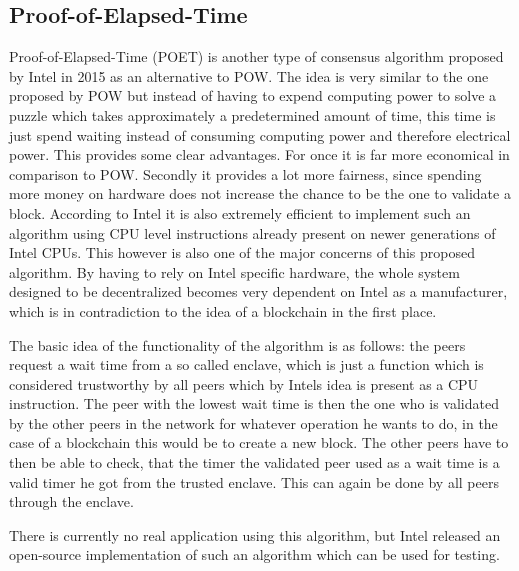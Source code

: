 \subsection{Proof-of-Elapsed-Time}

Proof-of-Elapsed-Time (POET) is another type of consensus algorithm proposed by Intel in 2015 as an alternative to POW. The idea is very similar to the one proposed by POW but instead of having
to expend computing power to solve a puzzle which takes approximately a predetermined amount of time, this time is just spend waiting instead of consuming computing power and therefore
electrical power. This provides some clear advantages. For once it is far more economical in comparison to POW. Secondly it provides a lot more fairness, since spending more money on hardware
does not increase the chance to be the one to validate a block. According to Intel it is also extremely efficient to implement such an algorithm using CPU level instructions already present on
newer generations of Intel CPUs. This however is also one of the major concerns of this proposed algorithm. By having to rely on Intel specific hardware, the whole system designed to be
decentralized becomes very dependent on Intel as a manufacturer, which is in contradiction to the idea of a blockchain in the first place.\cite{url:coinbase_consensus}\par
The basic idea of the functionality of the algorithm is as follows: the peers request a wait time from a so called enclave, which is just a function which is considered trustworthy by all peers
which by Intels idea is present as a CPU instruction. The peer with the lowest wait time is then the one who is validated by the other peers in the network for whatever operation he wants to do,
in the case of a blockchain this would be to create a new block. The other peers have to then be able to check, that the timer the validated peer used as a wait time is a valid timer he got from the
trusted enclave. This can again be done by all peers through the enclave.\par
There is currently no real application using this algorithm, but Intel released an open-source implementation of such an algorithm which can be used for testing.\cite{url:poet}
